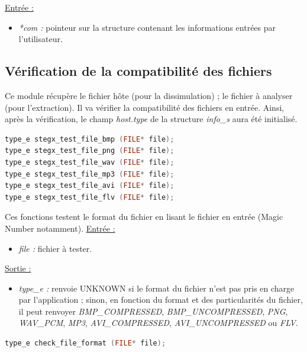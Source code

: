 \documentclass[11pt]{article}
\begin{document}
\underline{Entrée :} 
\begin{itemize}
\item \textit{*com :} pointeur sur la structure contenant les informations 
entrées par l'utilisateur. 
\newline 
\end{itemize}

\subsection{Vérification de la compatibilité des fichiers}

Ce module récupère le fichier hôte (pour la dissimulation) ; 
le fichier à analyser (pour l'extraction). Il va  vérifier la compatibilité des 
fichiers en entrée. 
Ainsi, après la vérification, le champ \textit{host.type} de la structure 
\textit{info\_s} aura été initialisé.  
\newline

\begin{lstlisting}[language=c]
type_e stegx_test_file_bmp (FILE* file);
type_e stegx_test_file_png (FILE* file);
type_e stegx_test_file_wav (FILE* file);
type_e stegx_test_file_mp3 (FILE* file);
type_e stegx_test_file_avi (FILE* file);
type_e stegx_test_file_flv (FILE* file);
\end{lstlisting}

Ces fonctions testent le format du fichier en lisant le fichier en entrée 
(Magic Number notamment). 
\newline
\underline{Entrée :} 
\begin{itemize}
\item \textit{file :} fichier à tester. 
\end{itemize}
\underline{Sortie :} 
\begin{itemize}
\item \textit{type\_e :} renvoie UNKNOWN si le format du fichier n'est pas pris en 
charge par l'application ; sinon, en fonction du format et des particularités 
du fichier, il peut renvoyer \textit{BMP\_COMPRESSED}, \textit{BMP\_UNCOMPRESSED}, 
\textit{PNG}, \textit{WAV\_PCM}, \textit{MP3}, \textit{AVI\_COMPRESSED}, 
\textit{AVI\_UNCOMPRESSED} ou \textit{FLV}. 
\newline 
\end{itemize}

\begin{lstlisting}[language=c]
type_e check_file_format (FILE* file);
\end{lstlisting}
\end{document}
